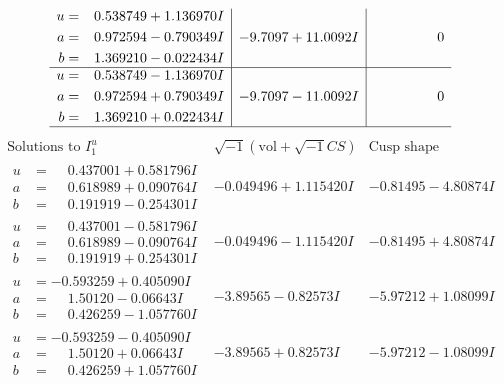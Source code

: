 \documentclass[1p]{elsarticle_modified}
\theoremstyle{definition}
\newcommand{\I}{\sqrt{-1}}
\begin{document}
$$\begin{array}{c|c|c}
\begin{aligned}
u &= \phantom{-}0.538749 + 1.136970 I \\
a &= \phantom{-}0.972594 - 0.790349 I \\
b &= \phantom{-}1.369210 - 0.022434 I\end{aligned}
 & -9.7097 + 11.0092 I & \phantom{-0.000000 } 0 \\ \hline\begin{aligned}
u &= \phantom{-}0.538749 - 1.136970 I \\
a &= \phantom{-}0.972594 + 0.790349 I \\
b &= \phantom{-}1.369210 + 0.022434 I\end{aligned}
 & -9.7097 - 11.0092 I & \phantom{-0.000000 } 0\\
 \hline 
 \end{array}$$\newpage$$\begin{array}{c|c|c}  
\text{Solutions to }I^u_{1}& \I (\text{vol} + \sqrt{-1}CS) & \text{Cusp shape}\\
 \hline 
\begin{aligned}
u &= \phantom{-}0.437001 + 0.581796 I \\
a &= \phantom{-}0.618989 + 0.090764 I \\
b &= \phantom{-}0.191919 - 0.254301 I\end{aligned}
 & -0.049496 + 1.115420 I & -0.81495 - 4.80874 I \\ \hline\begin{aligned}
u &= \phantom{-}0.437001 - 0.581796 I \\
a &= \phantom{-}0.618989 - 0.090764 I \\
b &= \phantom{-}0.191919 + 0.254301 I\end{aligned}
 & -0.049496 - 1.115420 I & -0.81495 + 4.80874 I \\ \hline\begin{aligned}
u &= -0.593259 + 0.405090 I \\
a &= \phantom{-}1.50120 - 0.06643 I \\
b &= \phantom{-}0.426259 - 1.057760 I\end{aligned}
 & -3.89565 - 0.82573 I & -5.97212 + 1.08099 I \\ \hline\begin{aligned}
u &= -0.593259 - 0.405090 I \\
a &= \phantom{-}1.50120 + 0.06643 I \\
b &= \phantom{-}0.426259 + 1.057760 I\end{aligned}
 & -3.89565 + 0.82573 I & -5.97212 - 1.08099 I \\ \hline\begin{aligned}

\end{aligned}
\end{array}$$
\end{document}

